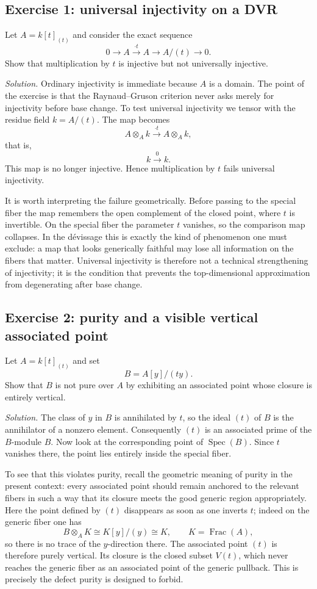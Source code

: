\documentclass[11pt,oneside]{article}
\newcommand{\Spec}{\operatorname{Spec}}
\newcommand{\ot}{\otimes}
\begin{document}
\subsection*{Exercise 1: universal injectivity on a DVR}

Let $A=k[t]_{(t)}$ and consider the exact sequence
\[
0\to A\xrightarrow{\cdot t} A\to A/(t)\to 0.
\]
Show that multiplication by $t$ is injective but not universally injective.

\emph{Solution.}  Ordinary injectivity is immediate because $A$ is a domain.  The point of the exercise is that the Raynaud--Gruson criterion never asks merely for injectivity before base change.  To test universal injectivity we tensor with the residue field $k=A/(t)$.  The map becomes
\[
A\ot_A k \xrightarrow{\cdot t} A\ot_A k,
\]
that is,
\[
k\xrightarrow{0} k.
\]
This map is no longer injective.  Hence multiplication by $t$ fails universal injectivity.

It is worth interpreting the failure geometrically.  Before passing to the special fiber the map remembers the open complement of the closed point, where $t$ is invertible.  On the special fiber the parameter $t$ vanishes, so the comparison map collapses.  In the d\'evissage this is exactly the kind of phenomenon one must exclude: a map that looks generically faithful may lose all information on the fibers that matter.  Universal injectivity is therefore not a technical strengthening of injectivity; it is the condition that prevents the top-dimensional approximation from degenerating after base change.

\subsection*{Exercise 2: purity and a visible vertical associated point}

Let $A=k[t]_{(t)}$ and set
\[
B=A[y]/(ty).
\]
Show that $B$ is not pure over $A$ by exhibiting an associated point whose closure is entirely vertical.

\emph{Solution.}  The class of $y$ in $B$ is annihilated by $t$, so the ideal $(t)$ of $B$ is the annihilator of a nonzero element.  Consequently $(t)$ is an associated prime of the $B$-module $B$.  Now look at the corresponding point of $\Spec(B)$.  Since $t$ vanishes there, the point lies entirely inside the special fiber.

To see that this violates purity, recall the geometric meaning of purity in the present context: every associated point should remain anchored to the relevant fibers in such a way that its closure meets the good generic region appropriately.  Here the point defined by $(t)$ disappears as soon as one inverts $t$; indeed on the generic fiber one has
\[
B\ot_A K \cong K[y]/(y) \cong K,
\qquad K=\operatorname{Frac}(A),
\]
so there is no trace of the $y$-direction there.  The associated point $(t)$ is therefore purely vertical.  Its closure is the closed subset $V(t)$, which never reaches the generic fiber as an associated point of the generic pullback.  This is precisely the defect purity is designed to forbid.
\end{document}

